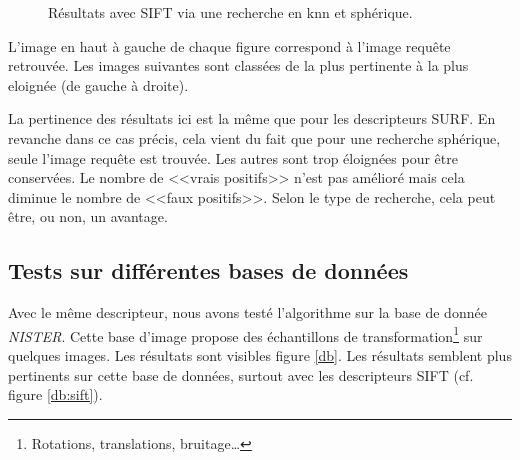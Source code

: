 \documentclass{article}
\begin{document}
\begin{figure}[!ht]%
  \centering
  \hspace{0.01\textwidth}
  \caption{Résultats avec SIFT via une recherche en knn et sphérique.}
  \label{sift}
\end{figure}

L'image en haut à gauche de chaque figure correspond à l'image requête retrouvée. Les images suivantes sont
classées de la plus pertinente à la plus eloignée (de gauche à droite).

La pertinence des résultats ici est la même que pour les descripteurs SURF. En revanche dans ce cas précis, cela vient du fait que pour une recherche sphérique,
seule l'image requête est trouvée. Les autres sont trop éloignées pour être conservées. Le nombre de <<vrais
positifs>> n'est pas amélioré mais cela diminue 
le nombre de <<faux positifs>>. Selon le type de recherche, cela peut être, ou non, un avantage.


\subsection{Tests sur différentes bases de données}

Avec le même descripteur, nous avons testé l'algorithme sur la base de donnée {\em NISTER}. Cette base
d'image propose des échantillons de transformation\footnote{Rotations, translations, bruitage\ldots} sur quelques images.
Les résultats sont visibles figure \ref{db}. Les résultats semblent plus pertinents sur cette base de données,
surtout avec les descripteurs SIFT (cf. figure \ref{db:sift}).
\end{document}

